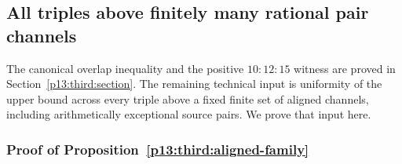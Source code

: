 \subsection{All triples above finitely many rational pair channels}
\label{p14:comp:third}

The canonical overlap inequality and the positive $10:12:15$ witness
are proved in Section~\ref{p13:third:section}.  The remaining technical
input is uniformity of the upper bound across every triple above a
fixed finite set of aligned channels, including arithmetically
exceptional source pairs.  We prove that input here.

\subsubsection{Proof of Proposition~\ref{p13:third:aligned-family}}
\label{p14:comp:third:aligned-family}

